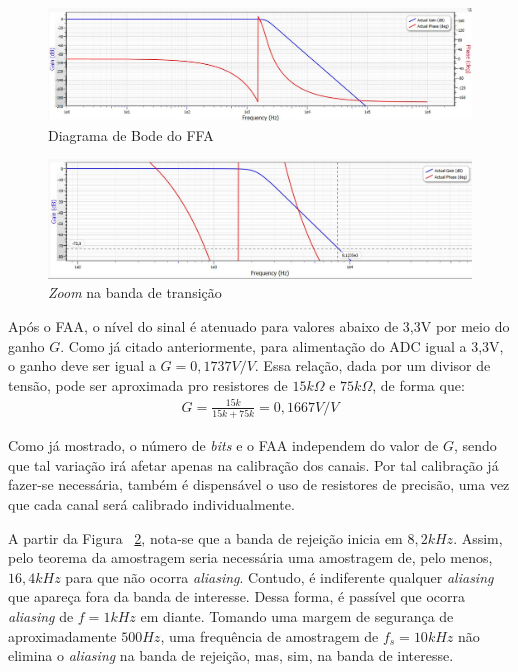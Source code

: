 \documentclass[
	12pt,				%
	openright,			%
	twoside,			%
	a4paper,			%
	english,			%
	french,				%
	spanish,			%
	brazil,				%
	]{abntex2}
\begin{document}
		\begin{figure}[!ht]
			\centering
			\includegraphics[width=\linewidth]{../Fotos/filterProGF.jpg}
			\caption{Diagrama de Bode do FFA}
			\label{fig:faaDiagramaBode}
		\end{figure}

		\begin{figure}[!ht]
			\centering
			\includegraphics[width=\linewidth]{../Fotos/filterProZoom.jpg}
			\caption{\textit{Zoom} na banda de transição}
			\label{fig:faaDiagramaBodeZoom}
		\end{figure}

		Após o FAA, o nível do sinal é atenuado para valores abaixo de
		3,3V por meio do ganho $G$. Como já citado anteriormente, para
		alimentação do ADC igual  a 3,3V, o ganho deve ser igual a $G =
		0,1737V/V$. Essa relação, dada por um divisor de tensão, pode
		ser aproximada pro resistores de $15k\Omega$ e $75k\Omega$, de
		forma que:
		\begin{gather*}
			G = \frac{15k}{15k+75k} = 0,1667V/V
		\end{gather*}

		Como já mostrado, o número de \textit{bits} e o FAA independem do valor
		de $G$, sendo que tal variação irá afetar apenas na calibração dos
		canais. Por tal calibração já fazer-se necessária, também é
		dispensável o uso de resistores de precisão, uma vez que cada
		canal será calibrado individualmente.

		A partir da Figura ~\ref{fig:faaDiagramaBodeZoom}, nota-se que a banda de rejeição inicia em
		$8,2kHz$. Assim, pelo teorema da amostragem seria necessária uma amostragem
		de, pelo menos, $16,4kHz$ para que não ocorra \textit{aliasing}. Contudo,
		é indiferente qualquer \textit{aliasing} que apareça fora da banda de interesse.
		Dessa forma, é passível que ocorra \textit{aliasing} de $f=1kHz$ em diante. Tomando
		uma margem de segurança de aproximadamente $500Hz$, uma frequência de amostragem
		de $f_s=10kHz$ não elimina o \textit{aliasing} na banda de rejeição, mas, sim, na banda
		de interesse.
\end{document}
